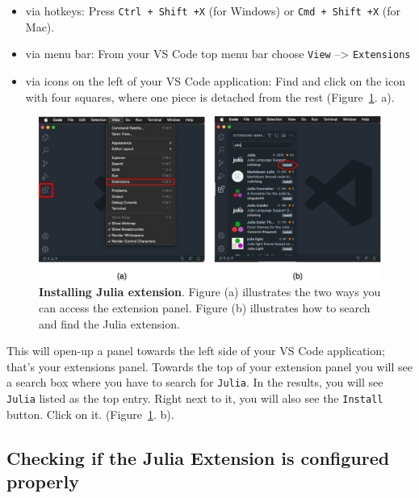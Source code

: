 \documentclass[
  letterpaper,
]{book}
\providecommand{\tightlist}{%
  \setlength{\itemsep}{0pt}\setlength{\parskip}{0pt}}\usepackage{longtable,booktabs,array}
\begin{document}
\begin{itemize}
\tightlist
\item
  via hotkeys: Press \texttt{Ctrl\ +\ Shift\ +X} (for Windows) or
  \texttt{Cmd\ +\ Shift\ +X} (for Mac).
\item
  via menu bar: From your VS Code top menu bar choose \texttt{View}
  --\textgreater{} \texttt{Extensions}
\item
  via icons on the left of your VS Code application: Find and click on
  the icon with four squares, where one piece is detached from the rest
  (Figure~\ref{fig-vscode-ext}. a).
\end{itemize}

\begin{figure}

{\centering \includegraphics{./images/vscode-extension.png}

}

\caption{\label{fig-vscode-ext}\textbf{Installing Julia extension}.
Figure (a) illustrates the two ways you can access the extension panel.
Figure (b) illustrates how to search and find the Julia extension.}

\end{figure}

This will open-up a panel towards the left side of your VS Code
application; that's your extensions panel. Towards the top of your
extension panel you will see a search box where you have to search for
\texttt{Julia}. In the results, you will see \texttt{Julia} listed as
the top entry. Right next to it, you will also see the \texttt{Install}
button. Click on it. (Figure~\ref{fig-vscode-ext}. b).

\hypertarget{sec-extension-check}{%
\subsection{Checking if the Julia Extension is configured
properly}\label{sec-extension-check}}
\end{document}
